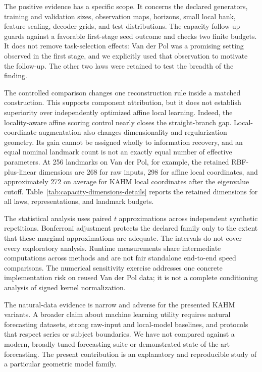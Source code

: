 \documentclass[10pt]{article}
\begin{document}
The positive evidence has a specific scope. It concerns the declared
generators, training and validation sizes, observation maps, horizons,
small local bank, feature scaling, decoder grids, and test distributions.
The capacity follow-up guards against a favorable first-stage seed outcome
and checks two finite budgets. It does not remove task-selection effects:
Van der Pol was a promising setting observed in the first stage, and we
explicitly used that observation to motivate the follow-up. The other two
laws were retained to test the breadth of the finding.

The controlled comparison changes one reconstruction rule inside a matched
construction. This supports component attribution, but it does not establish
superiority over independently optimized affine local learning. Indeed,
the locality-aware affine scoring control nearly closes the straight-branch
gap. Local-coordinate augmentation also changes dimensionality and
regularization geometry. Its gain cannot be assigned wholly to information
recovery, and an equal nominal landmark count is not an exactly equal
number of effective parameters. At 256 landmarks on Van der Pol, for
example, the retained RBF-plus-linear dimensions are 268 for raw inputs,
298 for affine local coordinates, and approximately 272 on average for
KAHM local coordinates after the eigenvalue cutoff.
Table~\ref{tab:capacity-dimensions-details} reports the retained dimensions
for all laws, representations, and landmark budgets.

The statistical analysis uses paired $t$ approximations across independent
synthetic repetitions. Bonferroni adjustment protects the declared family
only to the extent that these marginal approximations are adequate.
The intervals do not cover every exploratory analysis. Runtime measurements
share intermediate computations across methods and are not fair standalone
end-to-end speed comparisons. The numerical sensitivity exercise addresses
one concrete implementation risk on reused Van der Pol data; it is not a
complete conditioning analysis of signed kernel normalization.

The natural-data evidence is narrow and adverse for the presented KAHM
variants. A broader claim about machine learning utility requires natural
forecasting datasets, strong raw-input and local-model baselines, and
protocols that respect series or subject boundaries. We have not compared
against a modern, broadly tuned forecasting suite or demonstrated
state-of-the-art forecasting. The present contribution is an explanatory
and reproducible study of a particular geometric model family.
\end{document}
